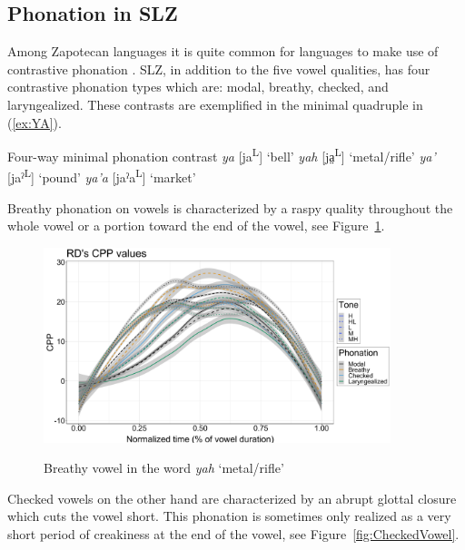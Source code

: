 \documentclass[12pt, letterpaper]{article}
\newcommand{\supr}[1]{\textsuperscript{#1}}
\begin{document}
\subsection{Phonation in SLZ} \label{sec:Phonation}

Among Zapotecan languages it is quite common for languages to make use of contrastive phonation \citep[e.g.,][]{avelinobecerraTopicsYalalagZapotec2004,longDiccionarioZapotecoSan2005,avelinoAcousticElectroglottographicAnalyses2010,lopeznicolasEstudiosFonologiaGramatica2016,chavez-peonInteractionMetricalStructure2010}. 
SLZ, in addition to the five vowel qualities, has four contrastive phonation types which are: modal, breathy, checked, and laryngealized. These contrasts are exemplified in the minimal quadruple in (\ref{ex:YA}). 

\ea \label{ex:YA} Four-way minimal phonation contrast
	\ea \textit{ya} [ja\supr{L}]	`bell'
	\ex \textit{yah}  [ja̤\supr{L}] `metal/rifle'
	\ex \textit{ya'}  [jaˀ\supr{L}]  `pound'
	\ex \textit{ya'a}  [jaˀa\supr{L}]  `market'
	\z 
\z 

Breathy phonation on vowels is characterized by a raspy quality throughout the whole vowel or a portion toward the end of the vowel, see Figure~\ref{fig:BreathyVowel}. 

\begin{figure}[!h]
	\centering
	\includegraphics[width=0.9\textwidth]{../RDCPP_line.png}
	\label{fig:BreathyVowel}
	\caption{Breathy vowel in the word \textit{yah} `metal/rifle'}
\end{figure}

Checked vowels on the other hand are characterized by an abrupt glottal closure which cuts the vowel short. This phonation is sometimes only realized as a very short period of creakiness at the end of the vowel, see Figure~\ref{fig:CheckedVowel}.  
\end{document}
